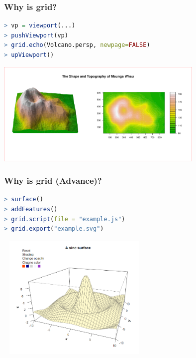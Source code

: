 \documentclass{beamer}
\begin{document}
\begin{frame}[fragile]
\frametitle{Why is \textbf{grid}?}

\begin{lstlisting}[language = R]
> vp = viewport(...)
> pushViewport(vp)
> grid.echo(Volcano.persp, newpage=FALSE)
> upViewport()
\end{lstlisting}

\begin{center}
  \includegraphics[height = 5cm, width = 10cm]{plot/demo_grid_example_3.pdf}
\end{center}

\end{frame}


\begin{frame}[fragile]
\frametitle{Why is \textbf{grid} (Advance)?}

\begin{lstlisting}[language = R]
> surface()
> addFeatures()
> grid.script(file = "example.js")
> grid.export("example.svg")

\end{lstlisting}

\begin{center}
  \includegraphics[height = 6cm, width = 7.5cm]{plot/origin_1.PNG}
\end{center}

\end{frame}
\end{document}
